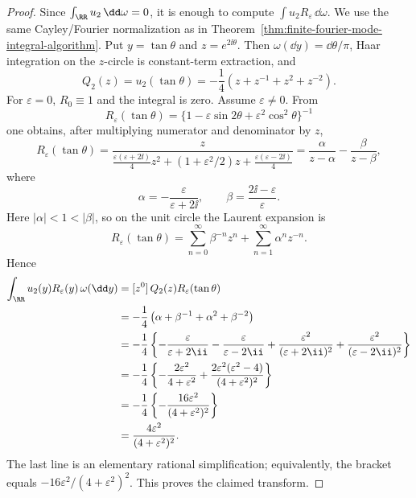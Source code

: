 \begin{proof}
Since \(\int_{\RR}u_2\,\dd\omega=0\), it is enough to compute
\(\int u_2R_\varepsilon\,\dd\omega\).  We use the same Cayley/Fourier
normalization as in Theorem~\ref{thm:finite-fourier-mode-integral-algorithm}.
Put \(y=\tan\theta\) and \(z=e^{2\ii\theta}\).  Then
\(\omega(\dd y)=\dd\theta/\pi\), Haar integration on the \(z\)-circle is
constant-term extraction, and
\[
  Q_2(z)=u_2(\tan\theta)
  =-\frac14(z+z^{-1}+z^2+z^{-2}).
\]
For \(\varepsilon=0\), \(R_0\equiv1\) and the integral is zero.  Assume
\(\varepsilon\ne0\).  From
\[
R_\varepsilon(\tan\theta)
=\{1-\varepsilon\sin2\theta+\varepsilon^2\cos^2\theta\}^{-1}
\]
one obtains, after multiplying numerator and denominator by \(z\),
\[
R_\varepsilon(\tan\theta)
=
\frac{z}
{\frac{\varepsilon(\varepsilon+2\ii)}4z^2
+(1+\varepsilon^2/2)z
+\frac{\varepsilon(\varepsilon-2\ii)}4}
=
\frac{\alpha}{z-\alpha}-\frac{\beta}{z-\beta},
\]
where
\[
\alpha=-\frac{\varepsilon}{\varepsilon+2\ii},
\qquad
\beta=\frac{2\ii-\varepsilon}{\varepsilon}.
\]
Here \(|\alpha|<1<|\beta|\), so on the unit circle the Laurent expansion is
\[
R_\varepsilon(\tan\theta)
=\sum_{n=0}^{\infty}\beta^{-n}z^n
+\sum_{n=1}^{\infty}\alpha^nz^{-n}.
\]
Hence
\[
\begin{aligned}
\int_{\RR}u_2(y)R_\varepsilon(y)\,\omega(\dd y)
&=[z^0]\,Q_2(z)R_\varepsilon(\tan\theta)\\
&=-\frac14\left(\alpha+\beta^{-1}+\alpha^2+\beta^{-2}\right)\\
&=-\frac14\left\{
-\frac{\varepsilon}{\varepsilon+2\ii}
-\frac{\varepsilon}{\varepsilon-2\ii}
+\frac{\varepsilon^2}{(\varepsilon+2\ii)^2}
+\frac{\varepsilon^2}{(\varepsilon-2\ii)^2}
\right\}  \\
&=-\frac14\left\{
-\frac{2\varepsilon^2}{4+\varepsilon^2}
+\frac{2\varepsilon^2(\varepsilon^2-4)}
{(4+\varepsilon^2)^2}
\right\}  \\
&=-\frac14\left\{
-\frac{16\varepsilon^2}{(4+\varepsilon^2)^2}
\right\}  \\
&=\frac{4\varepsilon^2}{(4+\varepsilon^2)^2}.
\end{aligned}
\]
The last line is an elementary rational simplification; equivalently, the
bracket equals \(-16\varepsilon^2/(4+\varepsilon^2)^2\).  This proves the
claimed transform.
\end{proof}

